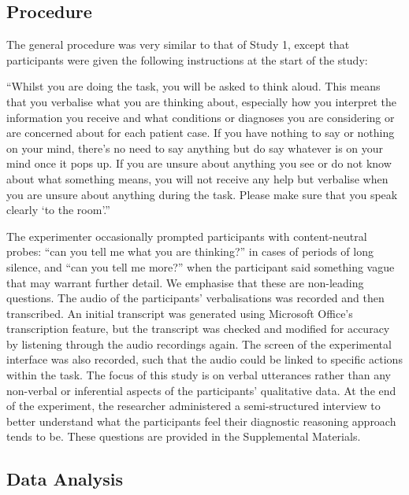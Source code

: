 \documentclass[a4paper, nobind]{templates/ociamthesis}
\begin{document}
\subsection*{Procedure}\label{procedure-1}

The general procedure was very similar to that of Study 1, except that participants were given the following instructions at the start of the study:

``Whilst you are doing the task, you will be asked to think aloud. This means that you verbalise what you are thinking about, especially how you interpret the information you receive and what conditions or diagnoses you are considering or are concerned about for each patient case. If you have nothing to say or nothing on your mind, there's no need to say anything but do say whatever is on your mind once it pops up. If you are unsure about anything you see or do not know about what something means, you will not receive any help but verbalise when you are unsure about anything during the task. Please make sure that you speak clearly `to the room'.''

The experimenter occasionally prompted participants with content-neutral probes: ``can you tell me what you are thinking?'' in cases of periods of long silence, and ``can you tell me more?'' when the participant said something vague that may warrant further detail. We emphasise that these are non-leading questions. The audio of the participants' verbalisations was recorded and then transcribed. An initial transcript was generated using Microsoft Office's transcription feature, but the transcript was checked and modified for accuracy by listening through the audio recordings again. The screen of the experimental interface was also recorded, such that the audio could be linked to specific actions within the task. The focus of this study is on verbal utterances rather than any non-verbal or inferential aspects of the participants' qualitative data. At the end of the experiment, the researcher administered a semi-structured interview to better understand what the participants feel their diagnostic reasoning approach tends to be. These questions are provided in the Supplemental Materials.

\subsection*{Data Analysis}\label{data-analysis-1}
\end{document}

